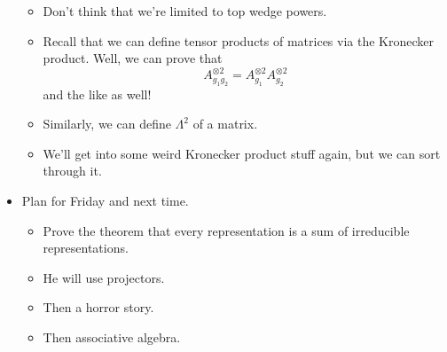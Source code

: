 \documentclass[../notes.tex]{subfiles}
\begin{document}
\begin{itemize}
\begin{itemize}
        \item Don't think that we're limited to top wedge powers.
        \item Recall that we can define tensor products of matrices via the Kronecker product. Well, we can prove that
        \begin{equation*}
            A_{g_1g_2}^{\otimes 2} = A_{g_1}^{\otimes 2}A_{g_2}^{\otimes 2}
        \end{equation*}
        and the like as well!
        \item Similarly, we can define $\Lambda^2$ of a matrix.
        \item We'll get into some weird Kronecker product stuff again, but we can sort through it.
    \end{itemize}
    \item Plan for Friday and next time.
    \begin{itemize}
        \item Prove the theorem that every representation is a sum of irreducible representations.
        \item He will use projectors.
        \item Then a horror story.
        \item Then associative algebra.
    \end{itemize}
\end{itemize}
\end{document}
